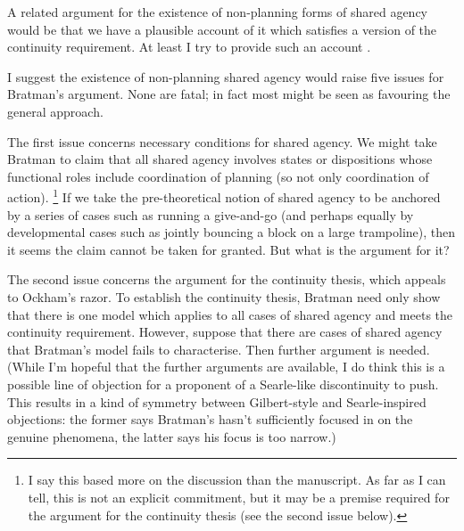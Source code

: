 \documentclass[12pt,letterpaper]{extarticle}
\begin{document}
A related argument for the existence of non-planning forms of shared agency would be that we have a plausible account of it which satisfies a version of the continuity requirement.
At least I try to provide such an account \citep{Butterfill:2011fk,Butterfill:2011_wija}.

I suggest the existence of non-planning shared agency would raise five issues for Bratman's argument.  None are fatal; in fact most might be seen as favouring the general approach.

The first issue concerns necessary conditions for shared agency. 
We might take Bratman to claim that all shared agency involves states or dispositions whose functional roles include coordination of planning (so not only coordination of action).%
\footnote{
I say this based more on the discussion than the manuscript.
As far as I can tell, this is not an explicit commitment, but it may be a premise required for the argument for the continuity thesis (see the second issue below).
}
If we take the pre-theoretical notion of shared agency to be anchored by a series of cases such as running a give-and-go (and perhaps equally by developmental cases such as jointly bouncing a block on a large trampoline), then it seems the claim cannot be taken for granted.
But what is the argument for it?

The second issue concerns the argument for the continuity thesis, which appeals to Ockham's razor.
To establish the continuity thesis, Bratman need only show that there is one model which applies to all cases of shared agency and meets the continuity requirement.
However, suppose that there are cases of shared agency that Bratman's model fails to characterise.
Then further argument is needed. 
(While I'm hopeful that the further arguments are available, I do think this is a possible line of objection for a proponent of a Searle-like discontinuity to push.
This results in a kind of symmetry between Gilbert-style and Searle-inspired objections: the former says Bratman's hasn't sufficiently focused in on the genuine phenomena, the latter says his focus is too narrow.)
\end{document}
